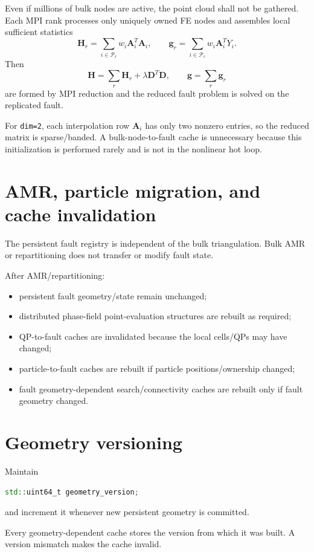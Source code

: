 \documentclass[11pt]{article}
\begin{document}
Even if millions of bulk nodes are active, the point cloud shall not be gathered.  Each MPI rank processes only uniquely owned FE nodes and assembles local sufficient statistics
\[
\mathbf{H}_r
=
\sum_{i\in\mathcal P_r}w_i\mathbf{A}_i^T\mathbf{A}_i,
\qquad
\mathbf{g}_r
=
\sum_{i\in\mathcal P_r}w_i\mathbf{A}_i^TY_i.
\]
Then
\[
\mathbf{H}=\sum_r\mathbf{H}_r+\lambda\mathbf{D}^T\mathbf{D},
\qquad
\mathbf{g}=\sum_r\mathbf{g}_r
\]
are formed by MPI reduction and the reduced fault problem is solved on the replicated fault.

For \texttt{dim=2}, each interpolation row $\mathbf{A}_i$ has only two nonzero entries, so the reduced matrix is sparse/banded.  A bulk-node-to-fault cache is unnecessary because this initialization is performed rarely and is not in the nonlinear hot loop.

\section{AMR, particle migration, and cache invalidation}

The persistent fault registry is independent of the bulk triangulation.  Bulk AMR or repartitioning does not transfer or modify fault state.

After AMR/repartitioning:
\begin{itemize}
  \item persistent fault geometry/state remain unchanged;
  \item distributed phase-field point-evaluation structures are rebuilt as required;
  \item QP-to-fault caches are invalidated because the local cells/QPs may have changed;
  \item particle-to-fault caches are rebuilt if particle positions/ownership changed;
  \item fault geometry-dependent search/connectivity caches are rebuilt only
        if fault geometry changed.
\end{itemize}

\section{Geometry versioning}
Maintain
\begin{lstlisting}[language=C++]
std::uint64_t geometry_version;
\end{lstlisting}
and increment it whenever new persistent geometry is committed.

Every geometry-dependent cache stores the version from which it was built.  A version mismatch makes the cache invalid.
\end{document}
